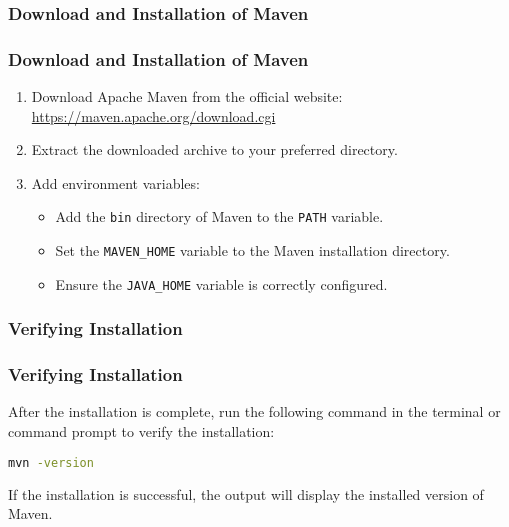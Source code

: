 \documentclass[aspectratio=169, table]{beamer}
\begin{document}
\subsubsection{Download and Installation of Maven}
\begin{frame}
	\frametitle{Download and Installation of Maven}
	\begin{enumerate}
		\item Download Apache Maven from the official website: \url{https://maven.apache.org/download.cgi}
		\item Extract the downloaded archive to your preferred directory.
		\item Add environment variables:
		\begin{itemize}
			\item Add the \texttt{bin} directory of Maven to the \texttt{PATH} variable.
			\item Set the \texttt{MAVEN\_HOME} variable to the Maven installation directory.
			\item Ensure the \texttt{JAVA\_HOME} variable is correctly configured.
		\end{itemize}
	\end{enumerate}
\end{frame}

\subsubsection{Verifying Installation}
\begin{frame}[fragile]
	\frametitle{Verifying Installation}
	After the installation is complete, run the following command in the terminal or command prompt to verify the installation:
	\begin{lstlisting}[language=bash]
		mvn -version
	\end{lstlisting}
	If the installation is successful, the output will display the installed version of Maven.
\end{frame}
\end{document}
